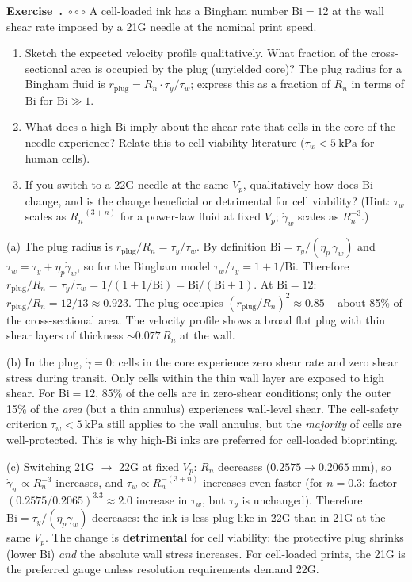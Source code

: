 \documentclass[11pt,a4paper]{article}
\newcommand{\diffC}{\textcolor{red!70!black}{$\circ\circ\circ$}}
\newcounter{exidx}[section]
\renewcommand{\theexidx}{\thesection.\arabic{exidx}}
\newenvironment{exercise}[1]%
  {\par\smallskip\refstepcounter{exidx}%
   \noindent\textbf{Exercise~\theexidx}~#1\quad}
  {\par\smallskip}
\newcommand{\gd}{\dot{\gamma}}
\newcommand{\Bi}{\mathrm{Bi}}
\begin{document}
\begin{exercise}{\diffC}
A cell-loaded ink has a Bingham number $\Bi=12$ at the wall shear rate
imposed by a 21G needle at the nominal print speed.
\begin{enumerate}[label=(\alph*),leftmargin=1.6em,itemsep=1pt]
  \item Sketch the expected velocity profile qualitatively. What fraction
    of the cross-sectional area is occupied by the plug (unyielded core)?
    The plug radius for a Bingham fluid is $r_\mathrm{plug}=
    R_n\cdot\tau_y/\tau_w$; express this as a fraction of $R_n$ in
    terms of $\Bi$ for $\Bi\gg 1$.
  \item What does a high $\Bi$ imply about the shear rate that cells in
    the core of the needle experience? Relate this to cell viability
    literature ($\tau_w<\SI{5}{\kPa}$ for human cells).
  \item If you switch to a 22G needle at the same $V_p$, qualitatively
    how does $\Bi$ change, and is the change beneficial or detrimental
    for cell viability? (Hint: $\tau_w$ scales as $R_n^{-(3+n)}$ for a
    power-law fluid at fixed $V_p$; $\gd_w$ scales as $R_n^{-3}$.)
\end{enumerate}
\begin{solution}
(a) The plug radius is $r_\mathrm{plug}/R_n = \tau_y/\tau_w$. By
definition $\Bi=\tau_y/(\eta_p\,\gd_w)$ and $\tau_w=\tau_y+\eta_p\gd_w$,
so for the Bingham model $\tau_w/\tau_y = 1+1/\Bi$. Therefore
$r_\mathrm{plug}/R_n = \tau_y/\tau_w = 1/(1+1/\Bi) = \Bi/(\Bi+1)$.
At $\Bi=12$: $r_\mathrm{plug}/R_n = 12/13\approx 0.923$.
The plug occupies $(r_\mathrm{plug}/R_n)^2\approx 0.85$ -- about 85\%
of the cross-sectional area. The velocity profile shows a broad flat
plug with thin shear layers of thickness $\sim0.077\,R_n$ at the wall.

(b) In the plug, $\gd=0$: cells in the core experience zero shear rate
and zero shear stress during transit. Only cells within the thin wall
layer are exposed to high shear. For $\Bi=12$, 85\% of the cells are
in zero-shear conditions; only the outer 15\% of the \emph{area}
(but a thin annulus) experiences wall-level shear. The cell-safety
criterion $\tau_w<\SI{5}{\kPa}$ still applies to the wall annulus, but
the \emph{majority} of cells are well-protected. This is why high-$\Bi$
inks are preferred for cell-loaded bioprinting.

(c) Switching 21G $\to$ 22G at fixed $V_p$: $R_n$ decreases
($0.2575\to\SI{0.2065}{\mm}$), so $\gd_w\propto R_n^{-3}$ increases,
and $\tau_w\propto R_n^{-(3+n)}$ increases even faster (for $n=0.3$:
factor $(0.2575/0.2065)^{3.3}\approx 2.0$ increase in $\tau_w$, but
$\tau_y$ is unchanged). Therefore $\Bi=\tau_y/(\eta_p\gd_w)$ decreases:
the ink is less plug-like in 22G than in 21G at the same $V_p$.
The change is \textbf{detrimental} for cell viability: the protective
plug shrinks (lower $\Bi$) \emph{and} the absolute wall stress increases.
For cell-loaded prints, the 21G is the preferred gauge unless resolution
requirements demand 22G.
\end{solution}
\end{exercise}
\end{document}
